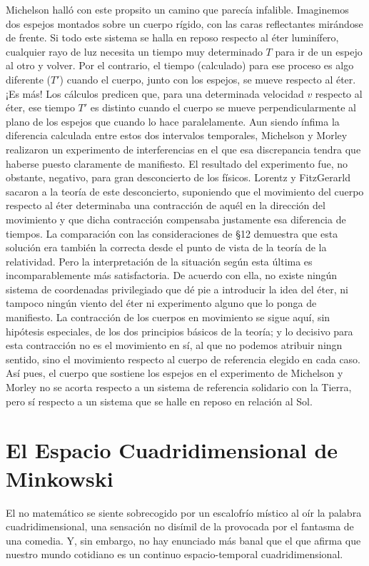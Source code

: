 \documentclass[spanish]{book}
\begin{document}
Michelson halló con este propsito un camino que parecía infalible. Imaginemos dos
espejos montados sobre un cuerpo rígido, con las caras reflectantes mirándose de
frente. Si todo este sistema se halla en reposo respecto al éter luminífero, cualquier
rayo de luz necesita un tiempo muy determinado $T$ para ir de un espejo al otro y
volver. Por el contrario, el tiempo (calculado) para ese proceso es algo diferente ($T'$)
cuando el cuerpo, junto con los espejos, se mueve respecto al éter. ¡Es más!  Los
cálculos predicen que, para una determinada velocidad $v$ respecto al éter, ese tiempo
$T'$ es distinto cuando el cuerpo se mueve perpendicularmente al plano de los espejos
que cuando lo hace paralelamente. Aun siendo ínfima la diferencia calculada entre
estos dos intervalos temporales, Michelson y Morley realizaron un experimento de
interferencias en el que esa discrepancia tendra que haberse puesto claramente de
manifiesto. El resultado del experimento fue, no obstante, negativo, para gran desconcierto 
de los físicos. Lorentz y FitzGerarld sacaron a la teoría de este desconcierto,
suponiendo que el movimiento del cuerpo respecto al éter determinaba una
contracción de aquél en la dirección del movimiento y que dicha contracción
compensaba justamente esa diferencia de tiempos. La comparación con las consideraciones
de \S 12 demuestra que esta solución era también la correcta desde el punto de
vista de la teoría de la relatividad. Pero la interpretación de la situación según esta
última es incomparablemente más satisfactoria. De acuerdo con ella, no existe ningún
sistema de coordenadas privilegiado que dé pie a introducir la idea del éter, ni
tampoco ningún viento del éter ni experimento alguno que lo ponga de manifiesto. La
contracción de los cuerpos en movimiento se sigue aquí, sin hipótesis especiales, de
los dos principios básicos de la teoría; y lo decisivo para esta contracción no es el
movimiento en sí, al que no podemos atribuir ningn sentido, sino el movimiento
respecto al cuerpo de referencia elegido en cada caso. Así pues, el cuerpo que sostiene
los espejos en el experimento de Michelson y Morley no se acorta respecto a un
sistema de referencia solidario con la Tierra, pero sí respecto a un sistema que se halle
en reposo en relación al Sol.


\chapter{El Espacio Cuadridimensional de Minkowski}

El no matemático se siente sobrecogido por un escalofrío místico al oír la palabra
cuadridimensional, una sensación no disímil de la provocada por el fantasma de
una comedia. Y, sin embargo, no hay enunciado más banal que el que afirma que
nuestro mundo cotidiano es un continuo espacio-temporal cuadridimensional.
\end{document}
